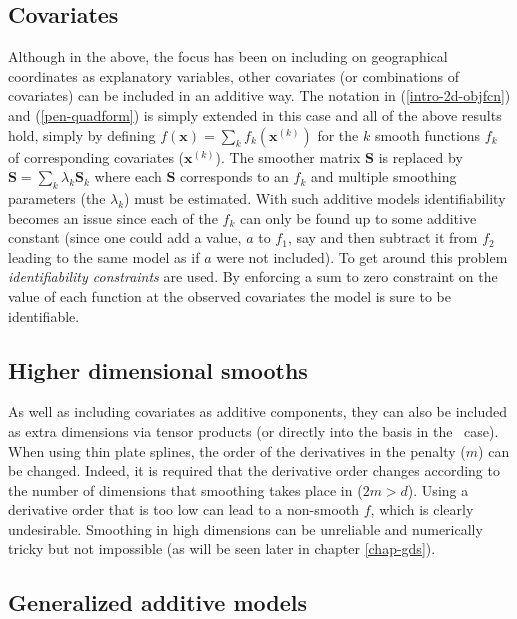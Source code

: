\subsection{Covariates}

Although in the above, the focus has been on including on geographical coordinates as explanatory variables, other covariates (or combinations of covariates) can be included in an additive way. The notation in (\ref{intro-2d-objfcn}) and (\ref{pen-quadform}) is simply extended in this case and all of the above results hold, simply by defining $f(\mathbf{x})=\sum_k f_k(\mathbf{x}^{(k)})$ for the $k$ smooth functions $f_k$ of corresponding covariates ($\mathbf{x}^{(k)}$). The smoother matrix $\mathbf{S}$ is replaced by $\mathbf{S}= \sum_k \lambda_k \mathbf{S}_k$ where each $\mathbf{S}$ corresponds to an $f_k$ and multiple smoothing parameters (the $\lambda_k$) must be estimated. With such additive models identifiability becomes an issue since each of the $f_k$ can only be found up to some additive constant (since one could add a value, $a$ to $f_1$, say and then subtract it from $f_2$ leading to the same model as if $a$ were not included). To get around this problem \textit{identifiability constraints} are used. By enforcing a sum to zero constraint on the value of each function at the observed covariates the model is sure to be identifiable. 

\subsection{Higher dimensional smooths}

As well as including covariates as additive components, they can also be included as extra dimensions via tensor products (or directly into the basis in the \tprs\ case). When using thin plate splines, the order of the derivatives in the penalty ($m$) can be changed. Indeed, it is required that the derivative order changes according to the number of dimensions that smoothing takes place in ($2m>d$). Using a derivative order that is too low can lead to a non-smooth $f$, which is clearly undesirable. Smoothing in high dimensions can be unreliable and numerically tricky but not impossible (as will be seen later in chapter \ref{chap-gds}).

\subsection{Generalized additive models}
\label{intro-extending-gams}

